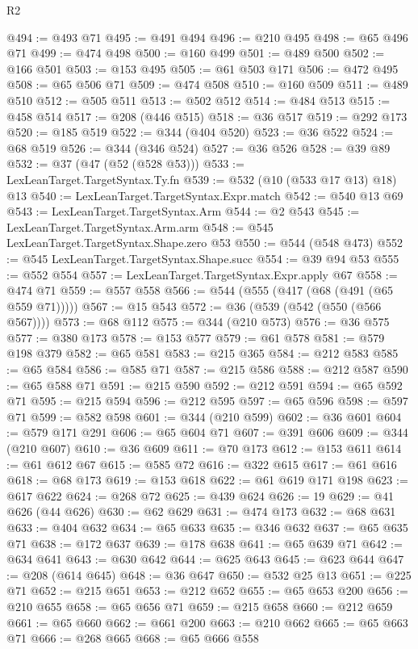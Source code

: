 \begin{lexlean}{R2}
\begin{coremodule}
@494 := @493 @71
@495 := @491 @494
@496 := @210 @495
@498 := @65 @496 @71
@499 := @474 @498
@500 := @160 @499
@501 := @489 @500
@502 := @166 @501
@503 := @153 @495
@505 := @61 @503 @171
@506 := @472 @495
@508 := @65 @506 @71
@509 := @474 @508
@510 := @160 @509
@511 := @489 @510
@512 := @505 @511
@513 := @502 @512
@514 := @484 @513
@515 := @458 @514
@517 := @208 (@446 @515)
@518 := @36 @517
@519 := @292 @173
@520 := @185 @519
@522 := @344 (@404 @520)
@523 := @36 @522
@524 := @68 @519
@526 := @344 (@346 @524)
@527 := @36 @526
@528 := @39 @89
@532 := @37 (@47 (@52 (@528 @53)))
@533 := LexLeanTarget.TargetSyntax.Ty.fn
@539 := @532 (@10 (@533 @17 @13) @18) @13
@540 := LexLeanTarget.TargetSyntax.Expr.match
@542 := @540 @13 @69
@543 := LexLeanTarget.TargetSyntax.Arm
@544 := @2 @543
@545 := LexLeanTarget.TargetSyntax.Arm.arm
@548 := @545 LexLeanTarget.TargetSyntax.Shape.zero @53
@550 := @544 (@548 @473)
@552 := @545 LexLeanTarget.TargetSyntax.Shape.succ
@554 := @39 @94 @53
@555 := @552 @554
@557 := LexLeanTarget.TargetSyntax.Expr.apply @67
@558 := @474 @71
@559 := @557 @558
@566 := @544 (@555 (@417 (@68 (@491 (@65 @559 @71)))))
@567 := @15 @543
@572 := @36 (@539 (@542 (@550 (@566 @567))))
@573 := @68 @112
@575 := @344 (@210 @573)
@576 := @36 @575
@577 := @380 @173
@578 := @153 @577
@579 := @61 @578
@581 := @579 @198 @379
@582 := @65 @581
@583 := @215 @365
@584 := @212 @583
@585 := @65 @584
@586 := @585 @71
@587 := @215 @586
@588 := @212 @587
@590 := @65 @588 @71
@591 := @215 @590
@592 := @212 @591
@594 := @65 @592 @71
@595 := @215 @594
@596 := @212 @595
@597 := @65 @596
@598 := @597 @71
@599 := @582 @598
@601 := @344 (@210 @599)
@602 := @36 @601
@604 := @579 @171 @291
@606 := @65 @604 @71
@607 := @391 @606
@609 := @344 (@210 @607)
@610 := @36 @609
@611 := @70 @173
@612 := @153 @611
@614 := @61 @612 @67
@615 := @585 @72
@616 := @322 @615
@617 := @61 @616
@618 := @68 @173
@619 := @153 @618
@622 := @61 @619 @171 @198
@623 := @617 @622
@624 := @268 @72
@625 := @439 @624
@626 := 19
@629 := @41 @626 (@44 @626)
@630 := @62 @629
@631 := @474 @173
@632 := @68 @631
@633 := @404 @632
@634 := @65 @633
@635 := @346 @632
@637 := @65 @635 @71
@638 := @172 @637
@639 := @178 @638
@641 := @65 @639 @71
@642 := @634 @641
@643 := @630 @642
@644 := @625 @643
@645 := @623 @644
@647 := @208 (@614 @645)
@648 := @36 @647
@650 := @532 @25 @13
@651 := @225 @71
@652 := @215 @651
@653 := @212 @652
@655 := @65 @653 @200
@656 := @210 @655
@658 := @65 @656 @71
@659 := @215 @658
@660 := @212 @659
@661 := @65 @660
@662 := @661 @200
@663 := @210 @662
@665 := @65 @663 @71
@666 := @268 @665
@668 := @65 @666 @558

\end{coremodule}
\end{lexlean}
